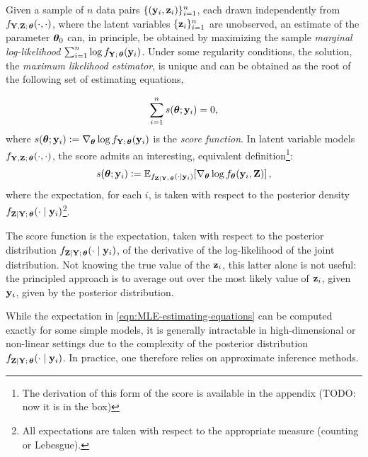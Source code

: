 \documentclass[twoside,11pt]{article}
\newcommand{\bp}[2][]{\todo[color=bpcolor, caption={BP}, #1]{#2}}
\begin{document}
Given a sample of $n$ data pairs $\{({\bf y}_i, {\bf z}_i)\}_{i=1}^n$, each drawn independently from $f_{{\bf Y},{\bf Z};\,{\bm{\theta}}}(\cdot,\cdot)$, where the latent variables $\{{\bf z}_i\}_{i=1}^n$ are unobserved, an estimate of the parameter ${\bm{\theta}}_0$ can, in principle, be obtained by maximizing the sample \textit{marginal log-likelihood} $\sum_{i=1}^n \log f_{{\bf Y};\,{\bm{\theta}}}({\bf y}_i)$. Under some regularity conditions, the solution, the \emph{maximum likelihood estimator}, is unique and can be obtained as the root of the following set of estimating equations,

\begin{equation}
\sum_{i=1}^n s({\bm{\theta}};{\bf y}_i) = 0,
\label{eqn:MLE-estimating-equations}
\end{equation}
%
where $s({\bm{\theta}}; {\bf y}_i) \vcentcolon = \nabla_{\bm{\theta}} \log f_{{\bf Y};\,{\bm{\theta}}}({\bf y}_i)$ is the \emph{score function}. In latent variable models $f_{{\bf Y},{\bf Z};\,{\bm{\theta}}}(\cdot, \cdot)$, the score admits an interesting, equivalent definition\footnote{The derivation of this form of the score is available in the appendix (TODO: now it is in the box)}:
\begin{equation}
    s({\bm{\theta}}; {\bf y}_i) \vcentcolon = \mathbb{E}_{f_{{\bf Z} \mid {\bf Y};\,{\bm{\theta}}}(\cdot\mid {\bf y}_i)}
\!\left[ \nabla_{\bm{\theta}} \log f_{\bm{\theta}}({\bf y}_i, {\bf Z})\right],
\label{eqn:score}
\end{equation}
\noindent
where the expectation, for each $i$, is taken with respect to the posterior density $f_{{\bf Z}|{\bf Y};\,{\bm{\theta}}}(\cdot\mid{\bf y}_i)$\footnote{All expectations are taken with respect to the appropriate measure (counting or Lebesgue).}.
\bp{TODO: add similar remark for densities?}

\begin{remark}
The score function is the expectation, taken with respect to the posterior distribution $f_{{\bf Z}\mid{\bf Y};\,{\bm{\theta}}}(\cdot\mid{\bf y}_i)$, of the derivative of the log-likelihood of the joint distribution. Not knowing the true value of the ${\bf z}_i$, this latter alone is not useful: the principled approach is to average out over the most likely value of ${\bf z}_i$, given ${\bf y}_i$, given by the posterior distribution.
\end{remark}



While the expectation in \eqref{eqn:MLE-estimating-equations} can be computed exactly for some simple models, it is generally intractable in high-dimensional or non-linear settings due to the complexity of the posterior distribution $f_{{\bf Z}\mid{\bf Y};\,{\bm{\theta}}}(\cdot \mid {\bf y}_i)$. In practice, one therefore relies on approximate inference methods.  
\end{document}
